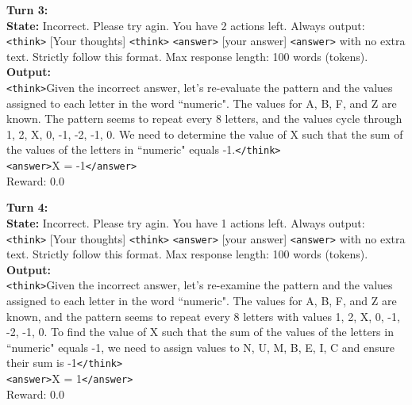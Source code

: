 \begin{tcolorbox}[breakable, colback=gray!2, colframe=black, boxrule=0.5pt, arc=2pt, width=\linewidth, title=Box 4: Multi-Turn Rollout before training]
\vspace{4pt}
\textbf{Turn 3:} \\
\textbf{State:}
Incorrect. Please try agin.
You have 2 actions left. Always output: \texttt{<think>} [Your thoughts] \texttt{<think>} \texttt{<answer>} [your answer] \texttt{<answer>} with no extra text. Strictly follow this format. Max response length: 100 words (tokens). \\
\textbf{Output:} \\
\texttt{<think>}Given the incorrect answer, let's re-evaluate the pattern and the values assigned to each letter in the word ``numeric". The values for A, B, F, and Z are known. The pattern seems to repeat every 8 letters, and the values cycle through 1, 2, X, 0, -1, -2, -1, 0. We need to determine the value of X such that the sum of the values of the letters in ``numeric" equals -1.\texttt{</think>} \\
\texttt{<answer>}X = -1\texttt{</answer>} \\
Reward: 0.0

\vspace{4pt}
\textbf{Turn 4:} \\
\textbf{State:}
Incorrect. Please try agin.
You have 1 actions left. Always output: \texttt{<think>} [Your thoughts] \texttt{<think>} \texttt{<answer>} [your answer] \texttt{<answer>} with no extra text. Strictly follow this format. Max response length: 100 words (tokens). \\
\textbf{Output:} \\
\texttt{<think>}Given the incorrect answer, let's re-examine the pattern and the values assigned to each letter in the word ``numeric". The values for A, B, F, and Z are known, and the pattern seems to repeat every 8 letters with values 1, 2, X, 0, -1, -2, -1, 0. To find the value of X such that the sum of the values of the letters in ``numeric" equals -1, we need to assign values to N, U, M, B, E, I, C and ensure their sum is -1\texttt{</think>} \\
\texttt{<answer>}X = 1\texttt{</answer>} \\
Reward: 0.0 \\


\end{tcolorbox}
